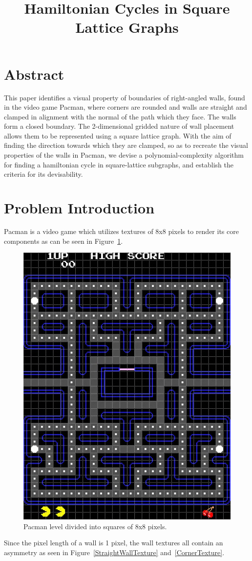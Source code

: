 \documentclass[a4paper,12pt]{article}
\title{Hamiltonian Cycles in Square Lattice Graphs}
\begin{document}
\date{\vspace{-5ex}}
\maketitle

\section{Abstract}
This paper identifies a visual property of boundaries of right-angled walls, found in the video game Pacman, where corners are rounded and walls are straight and clamped in alignment with the normal of the path which they face. The walls form a closed boundary. The 2-dimensional gridded nature of wall placement allows them to be represented using a square lattice graph. With the aim of finding the direction towards which they are clamped, so as to recreate the visual properties of the walls in Pacman, we devise a polynomial-complexity algorithm for finding a hamiltonian cycle in square-lattice subgraphs, and establish the criteria for its devisability.

\section{Problem Introduction}
Pacman is a video game which utilizes textures of 8x8 pixels to render its core components as can be seen in Figure~\ref{PacmanLevelGrid}. 

\begin{figure}[H]
\centering
\includegraphics[width=0.4\linewidth]{Image-1.jpg}
\caption {Pacman level divided into squares of 8x8 pixels.\autocite{pittman_pac-man_2009}}\label{PacmanLevelGrid}
\end{figure}

Since the pixel length of a wall is 1 pixel, the wall textures all contain an asymmetry as seen in Figure~\ref{StraightWallTexture} and~\ref{CornerTexture}.
\end{document}
